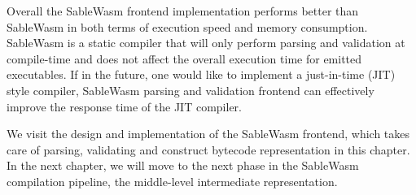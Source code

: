 Overall the SableWasm frontend implementation performs better than SableWasm in both terms of execution speed and memory consumption. SableWasm is a static compiler that will only perform parsing and validation at compile-time and does not affect the overall execution time for emitted executables. If in the future, one would like to implement a just-in-time (JIT) style compiler, SableWasm parsing and validation frontend can effectively improve the response time of the JIT compiler. 

We visit the design and implementation of the SableWasm frontend, which takes care of parsing, validating and construct bytecode representation in this chapter. In the next chapter, we will move to the next phase in the SableWasm compilation pipeline, the middle-level intermediate representation.